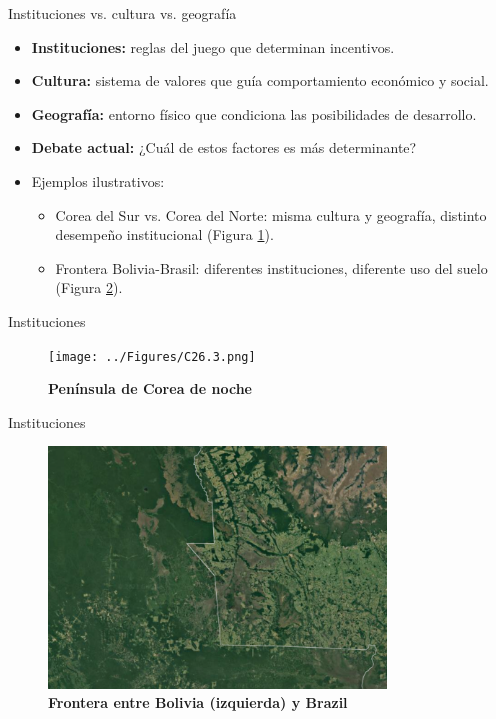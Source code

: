 \documentclass{beamer}
\begin{document}
\begin{frame}{Instituciones vs. cultura vs. geografía}
    \begin{itemize}
        \item \textbf{Instituciones:} reglas del juego que determinan incentivos.
        \item \textbf{Cultura:} sistema de valores que guía comportamiento económico y social.
        \item \textbf{Geografía:} entorno físico que condiciona las posibilidades de desarrollo.
        \item \textbf{Debate actual:} ¿Cuál de estos factores es más determinante?
        \item Ejemplos ilustrativos:
        \begin{itemize}
            \item Corea del Sur vs. Corea del Norte: misma cultura y geografía, distinto desempeño institucional (Figura \ref{fig:korea}).
            \item Frontera Bolivia-Brasil: diferentes instituciones, diferente uso del suelo (Figura \ref{fig:bolivia}).
        \end{itemize}
    \end{itemize}
\end{frame}

\begin{frame}{Instituciones}
    \begin{figure}[H]
    \begin{center}
    \texttt{[image: ../Figures/C26.3.png]}
    \end{center}
    \caption{\textbf{Península de Corea de noche}}
    \label{fig:korea}
    \end{figure}
\end{frame}

\begin{frame}{Instituciones}
    \begin{figure}[H]
        \begin{center}
            \includegraphics[width=0.8\textwidth]{../Figures/C26.2.png}
        \end{center}
        \caption{\textbf{Frontera entre Bolivia (izquierda) y Brazil}}
        \label{fig:bolivia}
    \end{figure}
\end{frame}
% 
\end{document}
